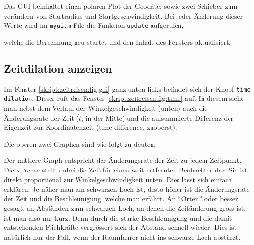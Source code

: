 \begin{refsection}
    Das GUI beinhaltet einen polaren Plot der Geodäte, sowie zwei Schieber zum verändern von Startradius und Startgeschwindigkeit. Bei jeder Änderung dieser Werte wird im \texttt{myui.m} File die Funktion \texttt{update} aufgerufen, 
      
    welche die Berechnung neu startet und den Inhalt des Fensters aktualisiert.
    
    \subsection{Zeitdilation anzeigen}
    Im Fenster \ref{skript:zeitreisen:fig:gui} ganz unten links befindet sich der Knopf \texttt{time dilation}. Dieser ruft das Fenster \ref{skript:zeitreisen:fig:time} auf. In diesem sieht man nebst dem Verlauf der Winkelgeschwindigkeit (unten) auch die Änderungsrate der Zeit ($\dot{t}$, in der Mitte) und die aufsummierte Differenz der Eigenzeit zur Koordinatenzeit (time difference, zuoberst).
    
    Die oberen zwei Graphen sind wie folgt zu deuten. 
    
    Der mittlere Graph entspricht der Änderungsrate der Zeit zu jedem Zeitpunkt. Die x-Achse stellt dabei die Zeit für einen weit entfernten Beobachter dar. Sie ist direkt proportional zur Winkelgeschwindigkeit unten. Dies lässt sich einfach erklären. Je näher man am schwarzen Loch ist, desto höher ist die Änderungsrate der Zeit und die Beschleunigung, welche man erfährt. An ``Orten'' oder besser gesagt, an Abständen zum schwarzen Loch, an denen die Zeitänderung gross ist, ist man also nur kurz. Denn durch die starke Beschleunigung und die damit entstehenden Fliehkräfte vergrössert sich der Abstand schnell wieder.
    Dies ist natürlich nur der Fall, wenn der Raumfahrer nicht ins schwarze Loch abstürzt.
    

\end{refsection}
